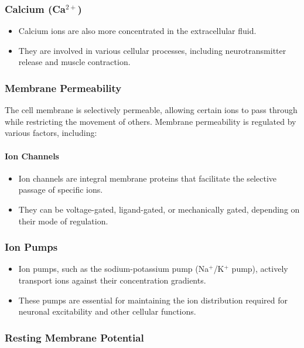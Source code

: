 \documentclass{article}
\begin{document}
\subsubsection{Calcium (Ca$^{2+}$)}

\begin{itemize}
  \item Calcium ions are also more concentrated in the extracellular fluid.
  \item They are involved in various cellular processes, including neurotransmitter release and muscle contraction.
\end{itemize}

\subsubsection{Membrane Permeability}

The cell membrane is selectively permeable, allowing certain ions to pass through while restricting the movement of others. Membrane permeability is regulated by various factors, including:

\paragraph{Ion Channels}

\begin{itemize}
  \item Ion channels are integral membrane proteins that facilitate the selective passage of specific ions.
  \item They can be voltage-gated, ligand-gated, or mechanically gated, depending on their mode of regulation.
\end{itemize}

\subsubsection{Ion Pumps}

\begin{itemize}
  \item Ion pumps, such as the sodium-potassium pump (Na$^+$/K$^+$ pump), actively transport ions against their concentration gradients.
  \item These pumps are essential for maintaining the ion distribution required for neuronal excitability and other cellular functions.
\end{itemize}

\subsubsection{Resting Membrane Potential}
\end{document}
